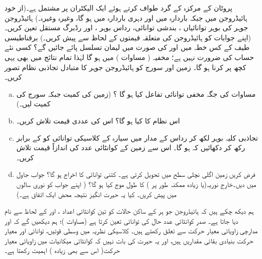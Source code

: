   پروٹان کے مرکزہ کے گرد طواف کرتے ہوئے ایک الیکٹران پر مشتمل ہے۔(از خود ہائیڈروجن میں  جبکہ باردارہ میں  اور دہری باردارہ  میں  ہو گا، وغیرہ وغیرہ۔) ہائیڈروجن جوہر کی بوہر توانائیاں ، بندشی توانائی، رداس بوہر ، اور رڈبرگ مستقل 
 تعین کریں۔ (اپنے جوابات کو ہائیڈروجن کی متعلقہ قیمتوں کے لحاظ سے پیش کریں۔) برقناطیسی طیف کے کس خطہ میں  اور  کی صورت میں لیمان تسلسل پائے جائیں گے؟  کسی نئے حساب کی ضرورت نہیں ہے؛ مخفیہ ( مساوات ) میں  ہو گا لہٰذا تمام نتائج میں بھی یہی کچھ پر کرنا ہو گا۔
زمین اور سورج کو ہائیڈروجن جوہر کا متبادل تجاذبی نظام تصور کریں۔
\begin{enumerate}[a.]
\item
 مساوات  کی جگہ مخفی توانائی تفاعل کیا ہو گا ؟ (زمین کی کمیت  جبکہ سورج کی کمیت  لیں۔)
\item
اس نظام کا   کیا ہو گا؟ اس کی عددی قیمت تلاش کریں۔
\item
تجاذبی کلیہ بوہر لکھ کر رداس  کے مدار میں سیارہ کے کلاسیکی توانائی کو  کے برابر رکھ کر دکھائیں کہ  ہو گا۔ اس سے زمین کے کوانٹائی عدد کی اندازاً قیمت تلاش کریں۔ 
\item
فرض کریں زمین اگلی نچلی سطح  میں تحویل کرتی ہے۔ کتنی توانائی کا اخراج ہو گا؟ جواب جاول میں دیں۔خارج نوریہ(یا زیادہ ممکنہ طور پر ) کا طول موج کیا ہو گا؟ ( اپنے جواب کو نوری سالوں میں پیش کریں۔ کیا یہ حیرت انگیز نتیجہ محض ایک اتفاق ہے۔)
\end{enumerate}

ہم دیکھ چکے ہیں کہ ہائیڈروجن جو ہر کے ساکن حالات کو تین کوانٹائی اعداد ،  اور  کے لحاظ سے نام دیا جاتا ہے۔ صدر کوانٹائی عدد  حال کی توانائی تعین کرتا ہے (مساوات )؛ ہم دیکھیں گے کہ  اور  مدارچی زاویائی معیار حرکت سے تعلق رکھتے ہیں۔ کلاسیکی نظریہ میں وسطی قوتیں، توانائی اور معیار حرکت بنیادی بقائی مقداریں ہیں، اور یہ حیرت کی بات نہیں کہ کوانٹائی میکانیات میں زاویائی معیار حرکت( اس سے بھی زیادہ ) اہمیت رکھتا ہے۔

